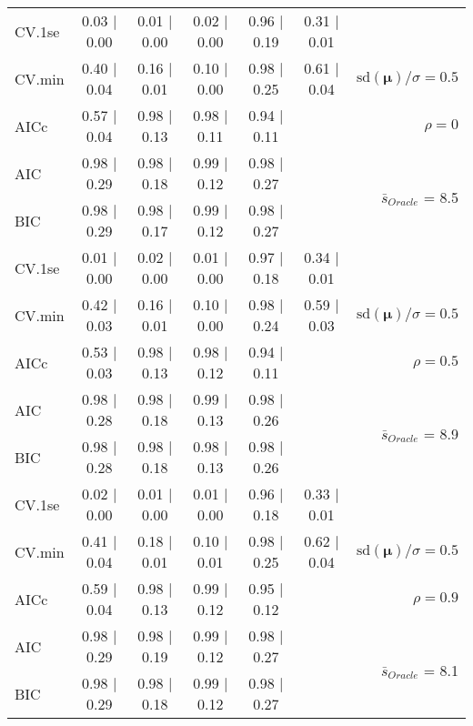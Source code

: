 \begin{table}
\begin{center}
\begin{tabular}{l*{5}{c}|r}
 \hline 
CV.1se & 0.03 $\mid$ 0.00 & 0.01 $\mid$ 0.00 & 0.02 $\mid$ 0.00 & 0.96 $\mid$ 0.19 & 0.31 $\mid$ 0.01 & \\
CV.min & 0.40 $\mid$ 0.04 & 0.16 $\mid$ 0.01 & 0.10 $\mid$ 0.00 & 0.98 $\mid$ 0.25 & 0.61 $\mid$ 0.04 &  $\mathrm{sd}(\mathbf{\mu})/\sigma=0.5$ \\
AICc & 0.57 $\mid$ 0.04 & 0.98 $\mid$ 0.13 & 0.98 $\mid$ 0.11 & 0.94 $\mid$ 0.11 & & $\rho=0$ \\
AIC & 0.98 $\mid$ 0.29 & 0.98 $\mid$ 0.18 & 0.99 $\mid$ 0.12 & 0.98 $\mid$ 0.27 & &  \multirow{2}{*}{$\bar{s}_{Oracle}$ = 8.5} \\
BIC & 0.98 $\mid$ 0.29 & 0.98 $\mid$ 0.17 & 0.99 $\mid$ 0.12 & 0.98 $\mid$ 0.27 & &  \\
 \hline 
CV.1se & 0.01 $\mid$ 0.00 & 0.02 $\mid$ 0.00 & 0.01 $\mid$ 0.00 & 0.97 $\mid$ 0.18 & 0.34 $\mid$ 0.01 & \\
CV.min & 0.42 $\mid$ 0.03 & 0.16 $\mid$ 0.01 & 0.10 $\mid$ 0.00 & 0.98 $\mid$ 0.24 & 0.59 $\mid$ 0.03 &  $\mathrm{sd}(\mathbf{\mu})/\sigma=0.5$ \\
AICc & 0.53 $\mid$ 0.03 & 0.98 $\mid$ 0.13 & 0.98 $\mid$ 0.12 & 0.94 $\mid$ 0.11 & & $\rho=0.5$ \\
AIC & 0.98 $\mid$ 0.28 & 0.98 $\mid$ 0.18 & 0.99 $\mid$ 0.13 & 0.98 $\mid$ 0.26 & &  \multirow{2}{*}{$\bar{s}_{Oracle}$ = 8.9} \\
BIC & 0.98 $\mid$ 0.28 & 0.98 $\mid$ 0.18 & 0.98 $\mid$ 0.13 & 0.98 $\mid$ 0.26 & &  \\
 \hline 
CV.1se & 0.02 $\mid$ 0.00 & 0.01 $\mid$ 0.00 & 0.01 $\mid$ 0.00 & 0.96 $\mid$ 0.18 & 0.33 $\mid$ 0.01 & \\
CV.min & 0.41 $\mid$ 0.04 & 0.18 $\mid$ 0.01 & 0.10 $\mid$ 0.01 & 0.98 $\mid$ 0.25 & 0.62 $\mid$ 0.04 &  $\mathrm{sd}(\mathbf{\mu})/\sigma=0.5$ \\
AICc & 0.59 $\mid$ 0.04 & 0.98 $\mid$ 0.13 & 0.99 $\mid$ 0.12 & 0.95 $\mid$ 0.12 & & $\rho=0.9$ \\
AIC & 0.98 $\mid$ 0.29 & 0.98 $\mid$ 0.19 & 0.99 $\mid$ 0.12 & 0.98 $\mid$ 0.27 & &  \multirow{2}{*}{$\bar{s}_{Oracle}$ = 8.1} \\
BIC & 0.98 $\mid$ 0.29 & 0.98 $\mid$ 0.18 & 0.99 $\mid$ 0.12 & 0.98 $\mid$ 0.27 & &  \\
 \hline 
\end{tabular}
\end{center}
\vspace{-1cm}
\end{table}




